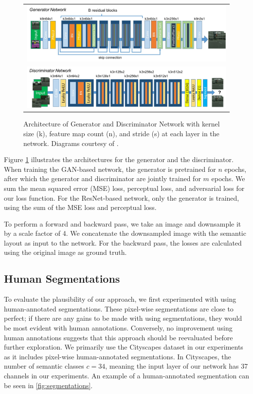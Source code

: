 \documentclass[10pt,twocolumn,letterpaper]{article}
\begin{document}
\begin{figure}[ht!]
\begin{center}
    \begin{tabular}{c}
	\includegraphics[width=6.5in]{images/generator_architecture.png} \\
	\includegraphics[width=6.5in]{images/discriminator_architecture.png}
    \end{tabular}
\end{center}
    \caption{Architecture of Generator and Discriminator Network with kernel
    size (k), feature map count (n), and stride (s) at each layer in the
    network. Diagrams courtesy of \cite{SRGAN}.}
    \label{fig:architecture}
\end{figure}

Figure \ref{fig:architecture} illustrates the architectures for the generator and
the discriminator. When training the GAN-based network, the generator is
pretrained for $n$ epochs, after which the generator and discriminator are
jointly trained for $m$ epochs. We sum the mean squared error (MSE) loss,
perceptual loss, and adversarial loss for our loss function. For the
ResNet-based network, only the generator is trained, using the sum of the MSE
loss and perceptual loss.

To perform a forward and backward pass, we take an image and downsample it by a
scale factor of 4. We concatenate the downsampled image with the semantic
layout as input to the network. For the backward pass, the losses are
calculated using the original image as ground truth.

\subsection{Human Segmentations}
To evaluate the plausibility of our approach, we first experimented with using
human-annotated segmentations. These pixel-wise segmentations are close to
perfect; if there are any gains to be made with using segmentations, they would
be most evident with human annotations. Conversely, no improvement using human
annotations suggests that this approach should be reevaluated before further
exploration. We primarily use the Cityscapes \cite{Cityscapes} dataset in our
experiments as it includes pixel-wise human-annotated segmentations. In
Cityscapes, the number of semantic classes $c = 34$, meaning the input layer of
our network has 37 channels in our experiments. An example of a human-annotated
segmentation can be seen in \ref{fig:segmentations}.
\end{document}
